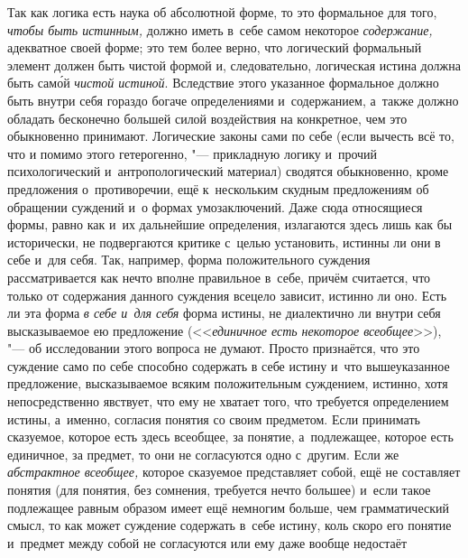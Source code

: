 Так как логика есть наука об абсолютной форме, то это
формальное для того, {\em чтобы быть истинным,}
должно иметь в~себе самом некоторое {\em содержание,}
адекватное своей форме; это тем более верно, что логический
формальный элемент должен быть чистой формой и, следовательно, логическая
истина должна быть сам\'{о}й {\em чистой истиной}.
Вследствие этого указанное формальное должно быть
внутри себя гораздо богаче определениями и~содержанием, а~также должно
обладать бесконечно большей силой воздействия на конкретное, чем это
обыкновенно принимают.
Логические законы сами по себе (если вычесть всё то, что и
помимо этого гетерогенно, "--- прикладную логику и~прочий
психологический и~антропологический материал) сводятся обыкновенно, кроме
предложения о~противоречии, ещё к~нескольким скудным предложениям об
обращении суждений и~о формах умозаключений. Даже сюда относящиеся формы,
равно как и~их дальнейшие определения, излагаются здесь лишь как бы
исторически, не подвергаются критике с~целью установить, истинны ли они в
себе и~для себя. Так, например, форма положительного суждения
рассматривается как нечто вполне правильное в~себе, причём
считается, что только от содержания данного суждения всецело зависит,
истинно ли оно. Есть ли эта форма {\em в
себе и~для себя} форма истины, не диалектично ли внутри себя
высказываемое ею предложение (<<{\em единичное есть некоторое
всеобщее}>>), "--- об исследовании этого вопроса не думают. Просто
признаётся, что это суждение само по себе способно содержать в
себе истину и~что вышеуказанное предложение, высказываемое всяким
положительным суждением, истинно, хотя непосредственно явствует, что ему не
хватает того, что требуется определением истины, а~именно, согласия понятия
со своим предметом. Если принимать сказуемое, которое есть здесь всеобщее,
за понятие, а~подлежащее, которое есть единичное, за предмет, то они не
согласуются одно с~другим. Если же {\em абстрактное всеобщее,}
которое сказуемое представляет собой, ещё не составляет
понятия (для понятия, без сомнения, требуется нечто большее) и~если такое
подлежащее равным образом имеет ещё немногим больше, чем грамматический
смысл, то как может суждение содержать в~себе истину, коль скоро его
понятие и~предмет между собой не согласуются или ему даже вообще недостаёт
